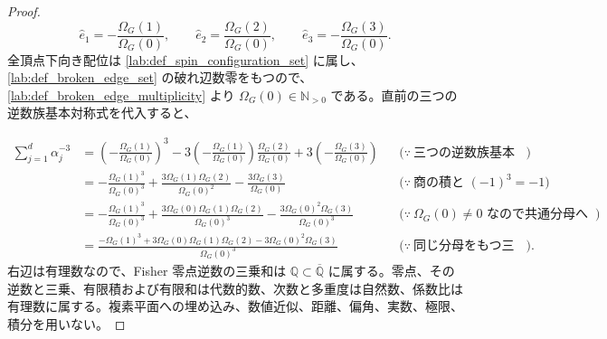 \documentclass[11pt,a4paper]{article}
\theoremstyle{remark}
\begin{document}
\begin{proof}
\[\widehat e_1=-\frac{\Omega_G(1)}{\Omega_G(0)},
\qquad
\widehat e_2=\frac{\Omega_G(2)}{\Omega_G(0)},
\qquad
\widehat e_3=-\frac{\Omega_G(3)}{\Omega_G(0)}.\]
全頂点下向き配位は
\cref{lab:def_spin_configuration_set}
 に属し、
\cref{lab:def_broken_edge_set}
 の破れ辺数零をもつので、
\cref{lab:def_broken_edge_multiplicity}
 より
$\Omega_G(0)\in\mathbb N_{>0}$
 である。直前の三つの逆数族基本対称式を代入すると、

\[\begin{aligned}
\sum_{j=1}^{d}\alpha_j^{-3}
&=
\left(-\frac{\Omega_G(1)}{\Omega_G(0)}\right)^3
-3\left(-\frac{\Omega_G(1)}{\Omega_G(0)}\right)
\frac{\Omega_G(2)}{\Omega_G(0)}
+3\left(-\frac{\Omega_G(3)}{\Omega_G(0)}\right)
&&\bigl(\because\ \text{三つの逆数族基本対称式を代入する}\bigr)\\
&=
-\frac{\Omega_G(1)^3}{\Omega_G(0)^3}
+\frac{3\Omega_G(1)\Omega_G(2)}{\Omega_G(0)^2}
-\frac{3\Omega_G(3)}{\Omega_G(0)}
&&\bigl(\because\ \text{商の積と }(-1)^3=-1\bigr)\\
&=
-\frac{\Omega_G(1)^3}{\Omega_G(0)^3}
+\frac{3\Omega_G(0)\Omega_G(1)\Omega_G(2)}{\Omega_G(0)^3}
-\frac{3\Omega_G(0)^2\Omega_G(3)}{\Omega_G(0)^3}
&&\bigl(\because\ \Omega_G(0)\ne0\text{ なので共通分母へ移す}\bigr)\\
&=
\frac{
  -\Omega_G(1)^3
  +3\Omega_G(0)\Omega_G(1)\Omega_G(2)
  -3\Omega_G(0)^2\Omega_G(3)
}{
  \Omega_G(0)^3
}
&&\bigl(\because\ \text{同じ分母をもつ三つの分数を加える}\bigr).
\end{aligned}\]
右辺は有理数なので、Fisher 零点逆数の三乗和は
$\mathbb Q\subset\overline{\mathbb Q}$
 に属する。零点、その逆数と三乗、有限積および有限和は代数的数、次数と多重度は自然数、係数比は有理数に属する。複素平面への埋め込み、数値近似、距離、偏角、実数、極限、積分を用いない。

\end{proof}
\end{document}
